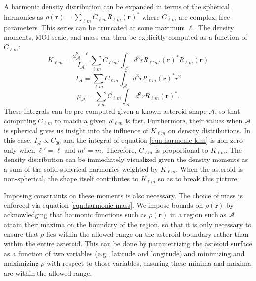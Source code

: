 A harmonic density distribution can be expanded in terms of the spherical harmonics as $\rho(\bm r) = \sum_{\ell m} C_{\ell m} R_{\ell m}(\bm r)^*$ where $C_{\ell m}$ are complex, free parameters. This series can be truncated at some maximum $\ell$. The density moments, MOI scale, and mass can then be explicitly computed as a function of $C_{\ell m}$:
\begin{equation}
  K_{\ell m} = \frac{a_\mathcal{A}^{2-\ell}}{I_\mathcal{A}} \sum_{\ell m} C_{\ell' m'} \int_\mathcal{A} d^3 r R_{\ell' m'}(\bm r)^* R_{\ell m}(\bm r)
  \label{eqn:harmonic-klm}
\end{equation}
\begin{equation}
  I_\mathcal{A} = \sum_{\ell m} C_{\ell m} \int_\mathcal{A} d^3 r R_{\ell m}(\bm r)^* r^2
  \label{eqn:harmonic-ia}
\end{equation}
\begin{equation}
  \mu_\mathcal{A} = \sum_{\ell m} C_{\ell m} \int_\mathcal{A} d^3 r R_{\ell m}(\bm r)^*.
  \label{eqn:harmonic-mass}
\end{equation}
These integrals can be pre-computed given a known asteroid shape $\mathcal{A}$, so that computing $C_{\ell m}$ to match a given $K_{\ell m}$ is fast. Furthermore, their values when $\mathcal{A}$ is spherical gives us insight into the influence of $K_{\ell m}$ on density distributions. In this case, $I_\mathcal{A} \propto C_{00}$ and the integral of equation \ref{eqn:harmonic-klm} is non-zero only when $\ell' = \ell$ and $m'=m$. Therefore, $C_{\ell m}$ is proportional to $K_{\ell m}$. The density distribution can be immediately visualized given the density moments as a sum of the solid spherical harmonics weighted by $K_{\ell m}$. When the asteroid is non-spherical, the shape itself contributes to $K_{\ell m}$ so as to break this picture.

Imposing constraints on these moments is also necessary. The choice of mass is enforced via equation \ref{eqn:harmonic-mass}. We impose bounds on $\rho(\bm r)$ by acknowledging that harmonic functions such as $\rho(\bm r)$ in a region such as $\mathcal{A}$ attain their maxima on the boundary of the region, so that it is only necessary to ensure that $\rho$ lies within the allowed range on the asteroid boundary rather than within the entire asteroid. This can be done by parametrizing the asteroid surface as a function of two variables (e.g., latitude and longitude) and minimizing and maximizing $\rho$ with respect to those variables, ensuring these minima and maxima are within the allowed range.







